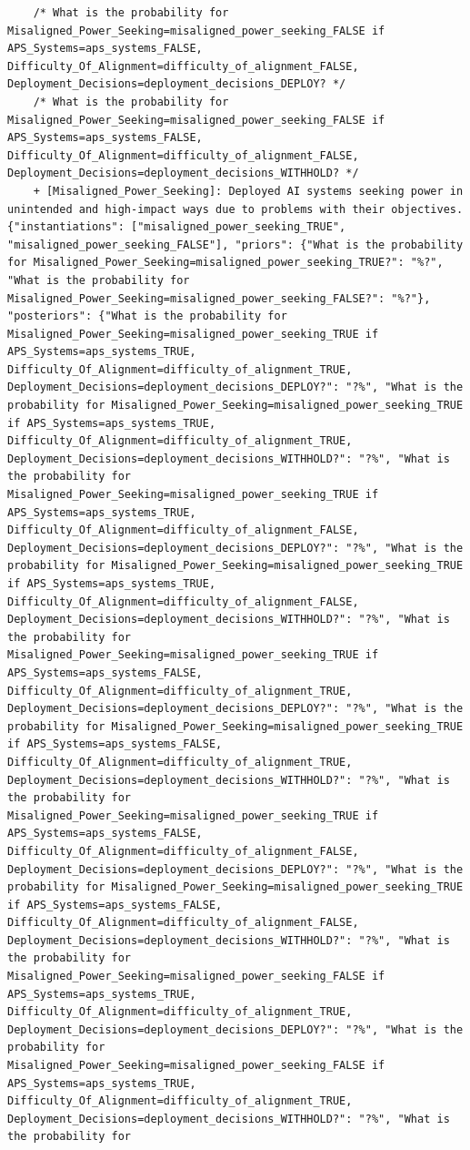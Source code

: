 \documentclass[
  11pt,
  letterpaper,
]{book}
\begin{document}
\begin{landscape}
\begin{verbatim}
    /* What is the probability for Misaligned_Power_Seeking=misaligned_power_seeking_FALSE if APS_Systems=aps_systems_FALSE, Difficulty_Of_Alignment=difficulty_of_alignment_FALSE, Deployment_Decisions=deployment_decisions_DEPLOY? */
    /* What is the probability for Misaligned_Power_Seeking=misaligned_power_seeking_FALSE if APS_Systems=aps_systems_FALSE, Difficulty_Of_Alignment=difficulty_of_alignment_FALSE, Deployment_Decisions=deployment_decisions_WITHHOLD? */
    + [Misaligned_Power_Seeking]: Deployed AI systems seeking power in unintended and high-impact ways due to problems with their objectives. {"instantiations": ["misaligned_power_seeking_TRUE", "misaligned_power_seeking_FALSE"], "priors": {"What is the probability for Misaligned_Power_Seeking=misaligned_power_seeking_TRUE?": "%?", "What is the probability for Misaligned_Power_Seeking=misaligned_power_seeking_FALSE?": "%?"}, "posteriors": {"What is the probability for Misaligned_Power_Seeking=misaligned_power_seeking_TRUE if APS_Systems=aps_systems_TRUE, Difficulty_Of_Alignment=difficulty_of_alignment_TRUE, Deployment_Decisions=deployment_decisions_DEPLOY?": "?%", "What is the probability for Misaligned_Power_Seeking=misaligned_power_seeking_TRUE if APS_Systems=aps_systems_TRUE, Difficulty_Of_Alignment=difficulty_of_alignment_TRUE, Deployment_Decisions=deployment_decisions_WITHHOLD?": "?%", "What is the probability for Misaligned_Power_Seeking=misaligned_power_seeking_TRUE if APS_Systems=aps_systems_TRUE, Difficulty_Of_Alignment=difficulty_of_alignment_FALSE, Deployment_Decisions=deployment_decisions_DEPLOY?": "?%", "What is the probability for Misaligned_Power_Seeking=misaligned_power_seeking_TRUE if APS_Systems=aps_systems_TRUE, Difficulty_Of_Alignment=difficulty_of_alignment_FALSE, Deployment_Decisions=deployment_decisions_WITHHOLD?": "?%", "What is the probability for Misaligned_Power_Seeking=misaligned_power_seeking_TRUE if APS_Systems=aps_systems_FALSE, Difficulty_Of_Alignment=difficulty_of_alignment_TRUE, Deployment_Decisions=deployment_decisions_DEPLOY?": "?%", "What is the probability for Misaligned_Power_Seeking=misaligned_power_seeking_TRUE if APS_Systems=aps_systems_FALSE, Difficulty_Of_Alignment=difficulty_of_alignment_TRUE, Deployment_Decisions=deployment_decisions_WITHHOLD?": "?%", "What is the probability for Misaligned_Power_Seeking=misaligned_power_seeking_TRUE if APS_Systems=aps_systems_FALSE, Difficulty_Of_Alignment=difficulty_of_alignment_FALSE, Deployment_Decisions=deployment_decisions_DEPLOY?": "?%", "What is the probability for Misaligned_Power_Seeking=misaligned_power_seeking_TRUE if APS_Systems=aps_systems_FALSE, Difficulty_Of_Alignment=difficulty_of_alignment_FALSE, Deployment_Decisions=deployment_decisions_WITHHOLD?": "?%", "What is the probability for Misaligned_Power_Seeking=misaligned_power_seeking_FALSE if APS_Systems=aps_systems_TRUE, Difficulty_Of_Alignment=difficulty_of_alignment_TRUE, Deployment_Decisions=deployment_decisions_DEPLOY?": "?%", "What is the probability for Misaligned_Power_Seeking=misaligned_power_seeking_FALSE if APS_Systems=aps_systems_TRUE, Difficulty_Of_Alignment=difficulty_of_alignment_TRUE, Deployment_Decisions=deployment_decisions_WITHHOLD?": "?%", "What is the probability for 
\end{verbatim}
\end{landscape}
\end{document}
